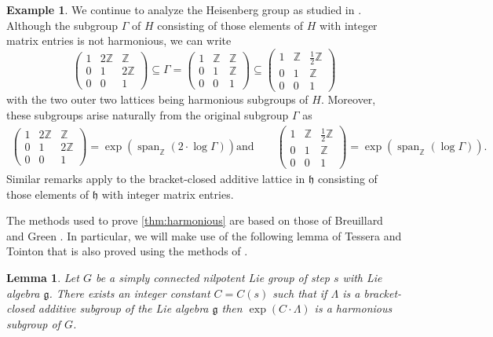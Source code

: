\documentclass[11pt]{article}
\numberwithin{equation}{section}
\theoremstyle{plain}
\newtheorem{lemma}[thm]{Lemma}
\theoremstyle{definition}
\newtheorem{example}[thm]{Example}
\theoremstyle{remark}
\numberwithin{equation}{section}
\newcommand{\Z}{\mathbb Z}
\numberwithin{equation}{section}
\begin{document}
\begin{example}
We continue to analyze the Heisenberg group as studied in . Although the subgroup $\Gamma$ of $H$ consisting of those elements of $H$ with integer matrix entries is not harmonious, we can write
\[
  \left(\begin{matrix} 1 & 2\Z & \Z \\ 0 & 1 & 2\Z \\ 0&0&1\end{matrix}\right) \subseteq \Gamma = \left(\begin{matrix} 1 & \Z & \Z \\ 0 & 1 & \Z \\ 0&0&1\end{matrix}\right) \subseteq \left(\begin{matrix} 1 & \Z & \frac{1}{2}\Z \\ 0 & 1 & \Z \\ 0&0&1\end{matrix}\right)
\]
with the two outer two lattices being harmonious subgroups of $H$. Moreover, these subgroups arise naturally from the original subgroup $\Gamma$ as
\begin{align*}
\left(\begin{matrix} 1 & 2\Z & \Z \\ 0 & 1 & 2\Z \\ 0&0&1\end{matrix}\right) = \exp\left(\operatorname{span}_\Z (2\cdot \log \Gamma) \right)
\text{and}\qquad 
\left(\begin{matrix} 1 & \Z & \frac{1}{2}\Z \\ 0 & 1 & \Z \\ 0&0&1\end{matrix}\right) = \exp\left(\operatorname{span}_\Z (\log \Gamma)\right).
\end{align*}
Similar remarks apply to the bracket-closed additive lattice in $\mathfrak{h}$ consisting of those elements of $\mathfrak{h}$ with integer matrix entries.
\end{example}

The methods used to prove \cref{thm:harmonious} are based on those of Breuillard and Green \cite{breuillard2011approximate}. In particular, we will make use of the following lemma of Tessera and Tointon \cite{MR3877012} that is also proved using the methods of \cite{breuillard2011approximate}.


\begin{lemma}
\label{lem:additive_to_harmonious}
Let $G$ be a simply connected nilpotent Lie group of step $s$ with Lie algebra $\mathfrak{g}$. There exists an integer constant $C=C(s)$ such that if $\Lambda$ is a bracket-closed additive subgroup of the Lie algebra $\mathfrak{g}$ then $\exp ( C \cdot \Lambda)$ is a harmonious subgroup of $G$.
\end{lemma}
\end{document}
